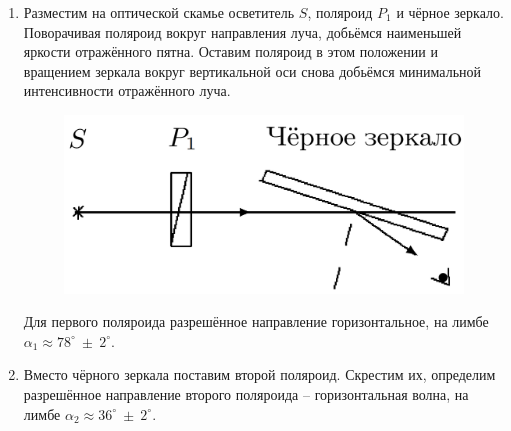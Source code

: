 	\begin{enumerate}
		\item Разместим на оптической скамье осветитель
		$S$, поляроид $P_1$ и чёрное зеркало. Поворачивая поляроид вокруг направления луча, добьёмся наименьшей яркости отражённого пятна. Оставим поляроид в этом положении и вращением зеркала вокруг вертикальной оси снова добьёмся минимальной интенсивности отражённого луча.
		
		\begin{figure}
			\centering
			\includegraphics[width=0.5\textheight]{./images/I.png}
			\caption{}
		\end{figure}
		
		Для первого поляроида разрешённое направление горизонтальное, на лимбе $\alpha_1 \approx 78^{\circ} ~ \pm ~ 2^{\circ}$.
		
		\item Вместо чёрного зеркала поставим второй поляроид. Скрестим их, определим разрешённое направление второго поляроида -- горизонтальная волна, на лимбе $\alpha_2 \approx 36^{\circ} ~ \pm ~ 2^{\circ}$.
	\end{enumerate}

